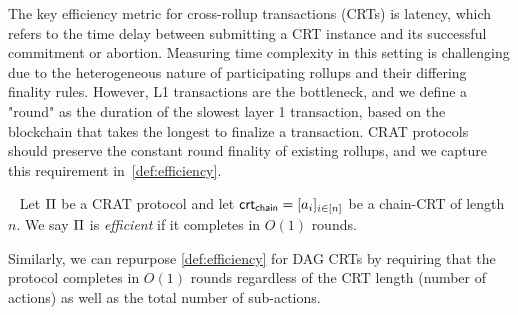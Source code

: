 The key efficiency metric for cross-rollup transactions (CRTs) is latency, which refers to the time delay between submitting a CRT instance and its successful commitment or abortion. Measuring time complexity in this setting is challenging due to the heterogeneous nature of participating rollups and their differing finality rules. However, L1 transactions are the bottleneck, and we define a "round" as the duration of the slowest layer 1 transaction, based on the blockchain that takes the longest to finalize a transaction. CRAT protocols should preserve the constant round finality of existing rollups, and we capture this requirement in~\cref{def:efficiency}. 





\begin{definition}[Efficiency]~\label{def:efficiency}
    Let $\Pi$ be a CRAT protocol and let $\mathsf{crt_{chain}} = [a_i]_{i \in [n]}$ be a chain-CRT of length $n$. We say $\Pi$ is \emph{efficient} if it completes in $O(1)$ rounds.
\end{definition}

Similarly, we can repurpose \cref{def:efficiency} for DAG CRTs by requiring that the protocol completes in $O(1)$ rounds regardless of the CRT length (number of actions) as well as the total number of sub-actions.



\done%



